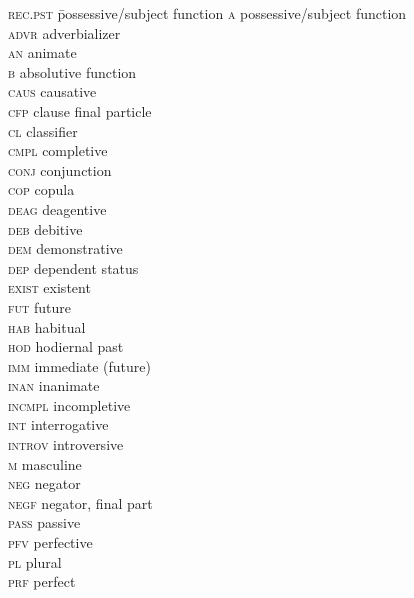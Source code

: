 \documentclass[output=paper]{langsci/langscibook}
\begin{document}
\begin{multicols}{2}
\begin{tabbing}
\textsc{rec.pst}\hspace{1em} \=  possessive/subject function\kill
\textsc{a} \>   {possessive}/subject function\\
\textsc{advr} \>   adverbializer\\
\textsc{an} \>   animate\\
\textsc{b} \>   absolutive function\\
\textsc{caus} \>   {causative}\\
\textsc{cfp} \>   clause final particle\\
\textsc{cl} \>   classifier\\
\textsc{cmpl} \>   {completive}\\
\textsc{conj} \>   conjunction\\
\textsc{cop} \>   {copula}\\
\textsc{deag} \>   deagentive\\
\textsc{deb} \>   debitive\\
\textsc{dem} \>   {demonstrative}\\
\textsc{dep} \>   {dependent status}\\
\textsc{exist} \>   existent\\
\textsc{fut} \>   future\\
\textsc{hab} \>   habitual\\
\textsc{hod} \>   hodiernal past\\
\textsc{imm} \>   immediate (future)\\
\textsc{inan} \>   inanimate\\
\textsc{incmpl} \>   {incompletive}\\
\textsc{int} \>   interrogative\\
\textsc{introv} \>   introversive\\
\textsc{m} \>   masculine\\
\textsc{neg} \>   negator\\
\textsc{negf} \>   negator, final part\\
\textsc{pass} \>   passive\\
\textsc{pfv} \>   {perfective}\\
\textsc{pl} \>   plural\\
\textsc{prf} \>   perfect\\

\end{tabbing}
\end{multicols}
\end{document}
